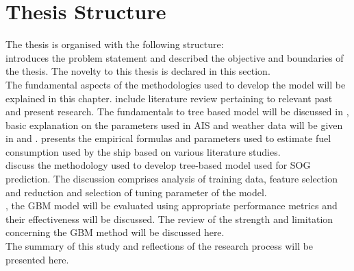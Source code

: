 \section{Thesis Structure}\label{sec:structure_thesis}

The thesis is organised with the following structure:\\

\textbf{} introduces the problem statement and described the objective and boundaries of the thesis. The novelty to this thesis is declared in this section.\\

\textbf{} The fundamental aspects of the methodologies used to develop the model will be explained in this chapter. include literature review pertaining to relevant past and present research. The fundamentals to tree based model will be discussed in , basic explanation on the parameters used in AIS and weather data will be given in  and .  presents the empirical formulas and parameters used to estimate fuel consumption used by the ship based on various literature studies.\\ 

\textbf{} discuss the methodology used to develop tree-based model used for SOG prediction. The discussion comprises analysis of training data, feature selection and reduction and selection of tuning parameter of the model.\\ 

\textbf{}, the GBM model will be evaluated using appropriate performance metrics and their effectiveness will be discussed. The review of the strength and limitation concerning the GBM method will be discussed here.\\

\textbf{} The summary of this study and reflections of the research process will be presented here. 




 






